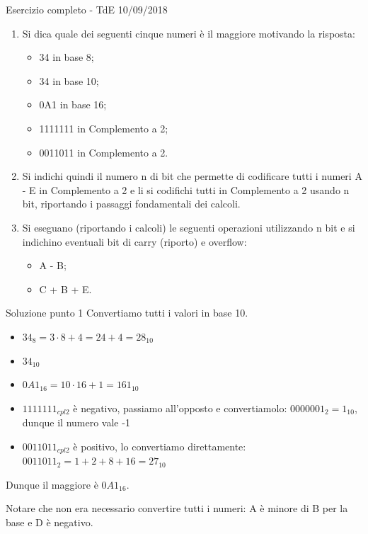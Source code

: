\documentclass[9pt, handout]{beamer}
\begin{document}
\begin{frame}{Esercizio completo - TdE 10/09/2018}
\begin{enumerate}
	\item Si dica quale dei seguenti cinque numeri è il maggiore motivando la risposta:
	\begin{itemize}
		\item 34 in base 8;
		\item 34 in base 10;
		\item 0A1 in base 16;
		\item 1111111 in Complemento a 2;
		\item 0011011 in Complemento a 2.
	\end{itemize}
	
	\item Si indichi quindi il numero n di bit che permette di codificare tutti i numeri A - E in Complemento a 2 e li si codifichi tutti in Complemento a 2 usando n bit, riportando i passaggi fondamentali dei calcoli.
	
	\item Si eseguano (riportando i calcoli) le seguenti operazioni utilizzando n bit e si indichino eventuali bit di carry (riporto) e overflow:
	\begin{itemize}
		\item A - B;
		\item C + B + E.
	\end{itemize}
\end{enumerate}
\end{frame}

\begin{frame}{Soluzione punto 1}
Convertiamo tutti i valori in base 10.
	\begin{itemize}
		\item $34_8 = 3 \cdot 8 +  4 = 24+4 = 28_{10}$
		\item $34_{10}$
		\item $0A1_{16} = 10 \cdot 16 + 1 = 161_{10}$
		\item $1111111_{cpl2}$ è negativo, passiamo all'opposto e convertiamolo: $0000001_2 = 1_{10}$, dunque il numero vale -1
		\item $0011011_{cpl2}$ è positivo, lo convertiamo direttamente: $0011011_2 = 1+2+8+16 = 27_{10}$
	\end{itemize}

Dunque il maggiore è $0A1_{16}$.

Notare che non era necessario convertire tutti i numeri: A è minore di B per la base e D è negativo.
\end{frame}
\end{document}
